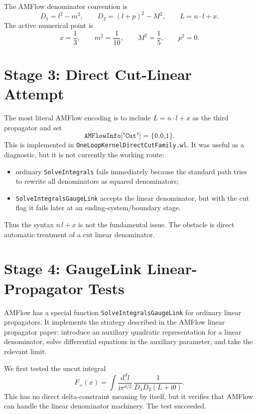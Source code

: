 \documentclass[11pt]{article}
\newcommand{\dd}{\mathrm{d}}
\newcommand{\ii}{\mathrm{i}}
\newcommand{\WL}[1]{\texttt{#1}}
\begin{document}
The AMFlow denominator convention is
\begin{equation}
  D_1=l^2-m^2,\qquad
  D_2=(l+p)^2-M^2,\qquad
  L=n\cdot l+x.
\end{equation}
The active numerical point is
\begin{equation}
  x=\frac13,\qquad m^2=\frac{1}{10},\qquad M^2=\frac15,\qquad p^2=0.
\end{equation}

\section{Stage 3: Direct Cut-Linear Attempt}

The most literal AMFlow encoding is to include \(L=n\cdot l+x\) as the third
propagator and set
\begin{equation}
  \WL{AMFlowInfo["Cut"] = \{0,0,1\}} .
\end{equation}
This is implemented in \WL{OneLoopKernelDirectCutFamily.wl}. It was useful as a
diagnostic, but it is not currently the working route:
\begin{itemize}
  \item ordinary \WL{SolveIntegrals} fails immediately because the standard
        path tries to rewrite all denominators as squared denominators;
  \item \WL{SolveIntegralsGaugeLink} accepts the linear denominator, but with
        the cut flag it fails later at an ending-system/boundary stage.
\end{itemize}
Thus the syntax \(n\,l+x\) is not the fundamental issue. The obstacle is direct
automatic treatment of a cut linear denominator.

\section{Stage 4: GaugeLink Linear-Propagator Tests}

AMFlow has a special function \WL{SolveIntegralsGaugeLink} for ordinary
linear propagators. It implements the strategy described in the AMFlow linear
propagator paper: introduce an auxiliary quadratic representation for a linear
denominator, solve differential equations in the auxiliary parameter, and take
the relevant limit.

We first tested the uncut integral
\begin{equation}
  F_+(x)
  =
  \int \frac{\dd^d l}{\ii \pi^{d/2}}\,
  \frac{1}{D_1D_2(L+\ii0)}.
\end{equation}
This has no direct delta-constraint meaning by itself, but it verifies that
AMFlow can handle the linear denominator machinery. The test succeeded.
\end{document}
